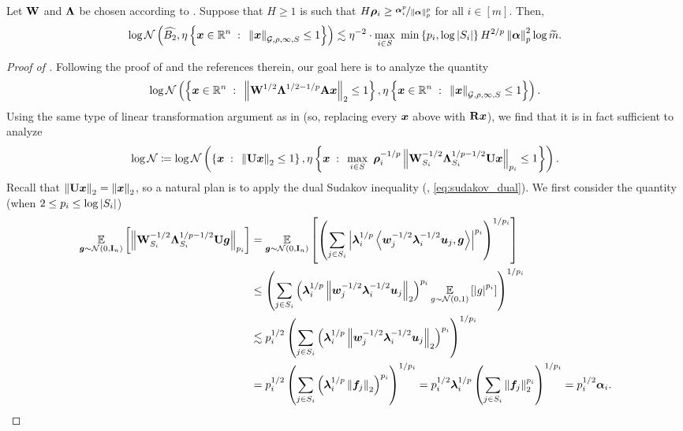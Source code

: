 \documentclass[11pt]{article}
\numberwithin{equation}{section}
\begin{document}
\begin{lemma}
\label{lemma:covering_poly_to_two}
Let $\mathbf{W}$ and $\mathbf{\Lambda}$ be chosen according to . Suppose that $H \ge 1$ is such that $H\bm{\rho}_i \ge \nicefrac{\bm{\alpha}_i^p}{\left\lVert \bm{\alpha} \right\rVert_p^p}$ for all $i \in [m]$. Then,
\begin{align*}
    \log\cN\inparen{\widehat{B_2}, \eta\inbraces{\vx\in\R^n \suchthat \polynorm{\vx} \le 1}} \lesssim \eta^{-2}\cdot{\underset{i \in S}{\max}\ \min\inbraces{p_i,\log\abs{S_i}}H^{2/p}\norm{\valpha}_p^2\log\mtilde}.
\end{align*}
\end{lemma}
\begin{proof}[Proof of ]
Following the proof of  and the references therein, our goal here is to analyze the quantity
\begin{align*}
    \log\mathcal{N}\left(\left\{\bm{x}\in\mathbb{R}^n {\;\; : \;\;} \left\lVert \mathbf{W}^{1/2}\mathbf{\Lambda}^{1/2-1/p}\mathbf{A}\bm{x} \right\rVert_2 \le 1\right\}, \eta\left\{\bm{x}\in\mathbb{R}^n {\;\; : \;\;} \left\lVert \bm{x} \right\rVert_{\mathcal{G},\rho,\infty, S} \le 1\right\}\right).
\end{align*}
Using the same type of linear transformation argument as in  (so, replacing every $\bm{x}$ above with $\mathbf{R}\bm{x}$), we find that it is in fact sufficient to analyze
\begin{align*}
    \log\cN \coloneqq \log\cN\inparen{\inbraces{\vx \suchthat \norm{\mU\vx}_2 \le 1}, \eta\inbraces{\vx \suchthat \max_{i \in S}\ \vrho_i^{-1/p}\norm{\mW_{S_i}^{-1/2}\mLambda^{1/p-1/2}_{S_i}\mU\vx}_{p_i} \le 1}}.
\end{align*}
Recall that $\left\lVert \mathbf{U}\bm{x} \right\rVert_2 = \left\lVert \bm{x} \right\rVert_2$, so a natural plan is to apply the dual Sudakov inequality (, \eqref{eq:sudakov_dual}). We first consider the quantity (when $2 \le p_i \le \log\left\lvert S_i \right\rvert$)
\begin{align*}
    \exvv{\vg\sim\cN(0,\mI_n)}{\norm{\mW_{S_i}^{-1/2}\mLambda^{1/p-1/2}_{S_i}\mU\vg}_{p_i}} &= \exvv{\vg\sim\cN(0,\mI_n)}{\inparen{\sum_{j \in S_i} \abs{\vlambda_i^{1/p}\ip{\vw_{j}^{-1/2}\vlambda_i^{-1/2}\vu_j,\vg}}^{p_i}}^{1/p_i}} \\
    &\le \inparen{\sum_{j\in S_i} \inparen{\vlambda_i^{1/p}\norm{\vw_j^{-1/2}\vlambda_i^{-1/2}\vu_j}_2}^{p_i}\exvv{g\sim\cN(0,1)}{\abs{g}^{p_i}}}^{1/p_i} \\
    &\lesssim p_i^{1/2} \inparen{\sum_{j\in S_i} \inparen{\vlambda_i^{1/p}\norm{\vw_j^{-1/2}\vlambda_i^{-1/2}\vu_j}_2}^{p_i}}^{1/p_i} \\
    &= p_i^{1/2}\inparen{\sum_{j \in S_i} \inparen{\vlambda_i^{1/p}\norm{\vf_j}_2}^{p_i}}^{1/p_i} = p_i^{1/2}\vlambda_i^{1/p}\inparen{\sum_{j \in S_i} \norm{\vf_j}_2^{p_i}}^{1/p_i} = p_i^{1/2}\valpha_i.

\end{align*}
\end{proof}
\end{document}
